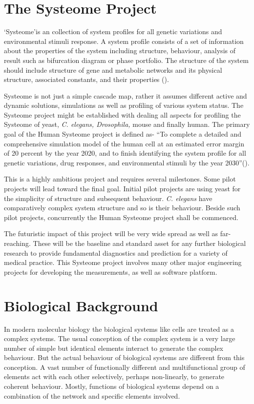 \section{The Systeome Project}
\lq Systeome\rq is an collection of system profiles for all genetic variations and environmental stimuli response. A system profile consists of a set of information about the properties of the system including structure, behaviour, analysis of result such as bifurcation diagram or phase portfolio. The structure of the system should include structure of gene and metabolic networks and its physical structure, associated constants, and their properties (\cite{Kitano:2002}).

Systeome is not just a simple cascade map, rather it assumes different active and dynamic solutions, simulations as well as profiling of various system status. The Systeome project might be established with dealing all aspects for profiling the Systeome of yeast, \textit{C. elegans, Drosophila,} mouse and finally human. The primary goal of the Human Systeome project is defined as- ``To complete a detailed and comprehensive simulation model of the human cell at an estimated error margin of 20 percent by the year 2020, and to finish identifying the system profile for all genetic variations, drug responses, and environmental stimuli by the year 2030''(\cite{Kitano:2002}).

This is a highly ambitious project and requires several milestones. Some pilot projects will lead toward the final goal. Initial pilot projects are using yeast for the simplicity of structure and subsequent behaviour. \textit{C. elegans} have comparatively complex system structure and so is their behaviour. Beside such pilot projects, concurrently the Human Systeome project shall be commenced.

The futuristic impact of this project will be very wide spread as well as far-reaching. These will be the baseline and standard asset for any further biological research to provide fundamental diagnostics and prediction for a variety of medical practice. This Systeome project involves many other major engineering projects for developing the measurements, as well as software platform.

\section{Biological Background}
In modern molecular biology the biological systems like cells are treated as a complex systems. The usual conception of the complex system is a very large number of simple but identical elements interact to generate the complex behaviour. But the actual behaviour of biological systems are different from this conception. A vast number of functionally different and multifunctional group of elements act with each other selectively, perhaps non-linearly, to generate coherent behaviour. Mostly, functions of biological systems depend on a combination of the network and specific elements involved. 

